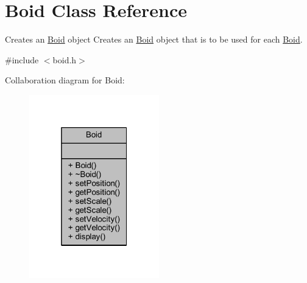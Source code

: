 \hypertarget{class_boid}{\section{Boid Class Reference}
\label{class_boid}
}


Creates an \hyperlink{class_boid}{Boid} object Creates an \hyperlink{class_boid}{Boid} object that is to be used for each \hyperlink{class_boid}{Boid}.  




{\ttfamily \#include $<$boid.\+h$>$}



Collaboration diagram for Boid\+:
\nopagebreak
\begin{figure}[H]
\begin{center}
\leavevmode
\includegraphics[width=160pt]{class_boid__coll__graph}
\end{center}
\end{figure}
